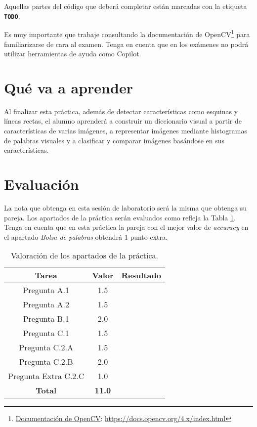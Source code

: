 Aquellas partes del código que deberá completar están marcadas con la etiqueta \textbf{\texttt{TODO}}.

Es muy importante que trabaje consultando la documentación de OpenCV\footnote{\href{https://docs.opencv.org/4.x/index.html}{Documentación de OpenCV}: \url{https://docs.opencv.org/4.x/index.html}} para familiarizarse de cara al examen. Tenga en cuenta que en los exámenes no podrá utilizar herramientas de ayuda como Copilot.

\section{Qué va a aprender}

Al finalizar esta práctica, además de detectar características como esquinas y líneas rectas, el alumno aprenderá a construir un diccionario visual a partir de características de varias imágenes, a representar imágenes mediante histogramas de palabras visuales y a clasificar y comparar imágenes basándose en sus características. 

\section{Evaluación}

La nota que obtenga en esta sesión de laboratorio será la misma que obtenga su pareja. Los apartados de la práctica serán evaluados como refleja la Tabla \ref{table:evaluacion}. Tenga en cuenta que en esta práctica la pareja con el mejor valor de \textit{accuracy} en el apartado \textit{Bolsa de palabras} obtendrá 1 punto extra.

\begin{table}[h!]
    \centering
    \begin{tabular}{|c|c|c|}
    \hline
    \textbf{Tarea} & \textbf{Valor} & \textbf{Resultado} \\
    \hline
    Pregunta A.1 & 1.5 & \\
    \hline
    Pregunta A.2 & 1.5 & \\
    \hline
    Pregunta B.1 & 2.0 & \\
    \hline
    Pregunta C.1 & 1.5 & \\
    \hline
    Pregunta C.2.A & 1.5 & \\
    \hline
    Pregunta C.2.B & 2.0 & \\
    \hline
    Pregunta Extra C.2.C & 1.0 & \\
    \hline
    \textbf{Total} & \textbf{11.0} & \\
    \hline
    \end{tabular}
    \caption{Valoración de los apartados de la práctica.}
    \label{table:evaluacion}
\end{table}

